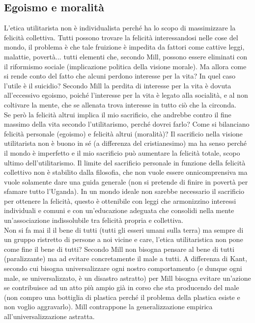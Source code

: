 \documentclass[10pt,a4paper]{article}
\begin{document}
\subsection{Egoismo e moralità}
L'etica utilitarista non è individualista perché ha lo scopo di massimizzare la felicità collettiva. Tutti possono trovare la felicità interessandosi nelle cose del mondo, il problema è che tale fruizione è impedita da fattori come cattive leggi, malattie, povertà... tutti elementi che, secondo Mill, possono essere eliminati con il riformismo sociale (implicazione politica della visione morale). Ma allora come si rende conto del fatto che alcuni perdono interesse per la vita? In quel caso l'utile è il suicidio? Secondo Mill la perdita di interesse per la vita è dovuta all'eccessivo egoismo, poiché l'interesse per la vita è legato alla socialità, e al non coltivare la mente, che se allenata trova interesse in tutto ciò che la circonda.\\
Se però la felicità altrui implica il mio sacrificio, che andrebbe contro il fine massimo della vita secondo l'utilitarismo, perché dovrei farlo? Come si bilanciano felicità personale (egoismo) e felicità altrui (moralità)? Il sacrificio nella visione utilitarista non è buono in sé (a differenza del cristianesimo) ma ha senso perché il mondo è imperfetto e il mio sacrificio può aumentare la felicità totale, scopo ultimo dell'utilitarismo. Il limite del sacrificio personale in funzione della felicità collettivo non è stabilito dalla filosofia, che non vuole essere onnicomprensiva ma vuole solamente dare una guida generale (non si pretende di finire in povertà per sfamare tutto l'Uganda). In un mondo ideale non sarebbe necessario il sacrificio per ottenere la felicità, questo è ottenibile con leggi che armonizzino interessi individuali e comuni e con un'educazione adeguata che consolidi nella mente un'associazione indissolubile tra felicità propria e collettiva. \\
Non si fa mai il il bene di tutti (tutti gli esseri umani sulla terra) ma sempre di un gruppo ristretto di persone a noi vicine e care, l'etica utilitaristica non pone come fine il bene di tutti? Secondo Mill non bisogna pensare al bene di tutti (paralizzante) ma ad evitare concretamente il male a tutti. A differenza di Kant, secondo cui bisogna universalizzare ogni nostro comportamento (e dunque ogni male, se universalizzato, è un disastro astratto) per Mill bisogna evitare un'azione se contribuisce ad un atto più ampio già in corso che sta producendo del male (non compro una bottiglia di plastica perché il problema della plastica esiste e non voglio aggravarlo). Mill contrappone la generalizzazione empirica all'universalizzazione astratta.
\end{document}
